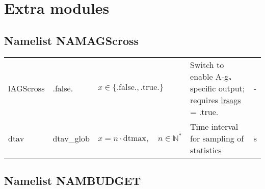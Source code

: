 \documentclass[twoside,11pt,fleqn,a4paper,english,openright]{report}
\begin{document}
\section{Extra modules}\label{par:extramod}

\subsection{Namelist NAMAGScross}\label{par:agscross}

\begin{center}
  \tablelasttail{
        &&&&\\\hline
  }
\begin{supertabular}{|l|p{2cm}|p{4cm}|p{6cm}|l|}
  lAGScross	& .false.	& $x\in\{\text{.false.},\text{.true.}\}$		& Switch to enable A-g$\rm_s$ specific output; requires \hyperlink{lrsags}{lrsags} = .true.	& -\\
  dtav		& dtav\_glob	& $x = n \cdot \text{dtmax}, \quad n \in \mathbb{N}^*$	& Time interval for sampling of statistics	& s\\
\end{supertabular}
\end{center}

\subsection{Namelist NAMBUDGET}\label{par:budget}
\end{document}

